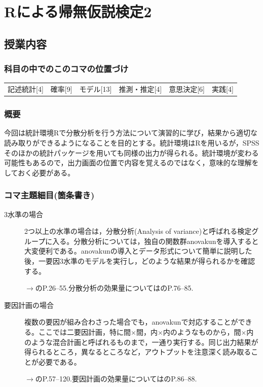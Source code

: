 \section{Rによる帰無仮説検定2}
\label{D1_lesson22}

\subsection{授業内容}
\subsubsection{科目の中でのこのコマの位置づけ}
\begin{tabular}[t]{cccccc}
    記述統計[4] & 確率[9] & モデル[13] & 推測・推定[4] & 意思決定[6] & 実践[4]
\end{tabular}

\subsubsection{概要}
今回は統計環境Rで分散分析を行う方法について演習的に学び，結果から適切な読み取りができるようになることを目的とする。統計環境はRを用いるが，SPSSそのほかの統計パッケージを用いても同様の出力が得られる。統計環境が変わる可能性もあるので，出力画面の位置で内容を覚えるのではなく，意味的な理解をしておく必要がある。
\subsubsection{コマ主題細目(箇条書き)}
\begin{description}

\item[3水準の場合]2つ以上の水準の場合は，分散分析(Analysis of variance)と呼ばれる検定グループに入る。分散分析については，独自の関数群anovakunを導入すると大変便利である。anovakunの導入とデータ形式について簡単に説明した後，一要因3水準のモデルを実行し，どのような結果が得られるかを確認する。

\begin{flushright}
    $\to$\citet{橋本201607}のP.26--55.分散分析の効果量については\citet{大久保201201}のP.76--85.
\end{flushright}

\item[要因計画の場合]複数の要因が組み合わさった場合でも，anovakunで対応することができる。ここでは二要因計画，特に間$\times$間，内$\times$内のようなものから，間$\times$内のような混合計画と呼ばれるものまで，一通り実行する。同じ出力結果が得られるところ，異なるところなど，アウトプットを注意深く読み取ることが必要である。

\begin{flushright}
    $\to$\citet{橋本201607}のP.57--120.要因計画の効果量については\citet{大久保201201}のP.86--88.
\end{flushright}

\end{description}

